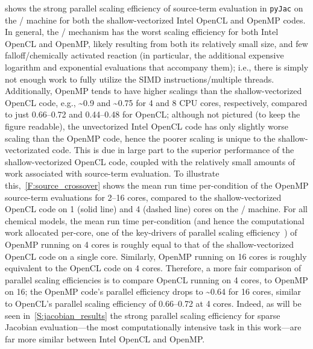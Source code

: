 \documentclass[12pt,number,sort&compress,preprint]{elsarticle}
\begin{document}
 shows the strong parallel scaling efficiency of source-term evaluation in \texttt{pyJac} on the \avx/ machine for both the shallow-vectorized Intel OpenCL and OpenMP codes.
In general, the \slash{} mechanism has the worst scaling efficiency for both Intel OpenCL and OpenMP, likely resulting from both its relatively small size, and few falloff\slash chemically activated reaction (in particular, the additional expensive logarithm and exponential evaluations that accompany them); i.e., there is simply not enough work to fully utilize the SIMD instructions\slash multiple threads.
Additionally, OpenMP tends to have higher scalings than the shallow-vectorized OpenCL code, e.g., \textasciitilde\num{0.9} and \textasciitilde\num{0.75} for \num{4} and \num{8} CPU cores, respectively, compared to just \numrange{0.66}{0.72} and \numrange{0.44}{0.48} for OpenCL; although not pictured (to keep the figure readable), the unvectorized Intel OpenCL code has only slightly worse scaling than the OpenMP code, hence the poorer scaling is unique to the shallow-vectorizated code.
This is due in large part to the superior performance of the shallow-vectorized OpenCL code, coupled with the relatively small amounts of work associated with source-term evaluation.
To illustrate this,~\cref{F:source_crossover} shows the mean run time per-condition of the OpenMP source-term evaluations for \numrange{2}{16} cores, compared to the shallow-vectorized OpenCL code on \num{1} (solid line) and \num{4} (dashed line) cores on the \avx/ machine.
For all chemical models, the mean run time per-condition (and hence the computational work allocated per-core, one of the key-drivers of parallel scaling efficiency~\cite{strong_scaling}) of OpenMP running on \num{4} cores is roughly equal to that of the shallow-vectorized OpenCL code on a single core.
Similarly, OpenMP running on \num{16} cores is roughly equivalent to the OpenCL code on \num{4} cores.
Therefore, a more fair comparison of parallel scaling efficiencies is to compare OpenCL running on \num{4} cores, to OpenMP on \num{16}; the OpenMP code's parallel efficiency drops to \textasciitilde\num{0.64} for \num{16} cores, similar to OpenCL's parallel scaling efficiency of \numrange{0.66}{0.72} at \num{4} cores.
Indeed, as will be seen in~\cref{S:jacobian_results} the strong parallel scaling efficiency for sparse Jacobian evaluation---the most computationally intensive task in this work---are far more similar between Intel OpenCL and OpenMP.
\end{document}
